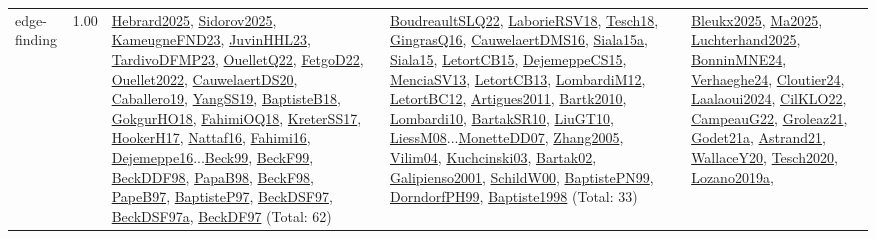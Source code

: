 {\begin{longtable}{p{3cm}r>{\raggedright\arraybackslash}p{6cm}>{\raggedright\arraybackslash}p{6cm}>{\raggedright\arraybackslash}p{8cm}}
\index{edge-finding}\index{Algorithms!edge-finding}edge-finding &  1.00 & \hyperref[detail:Hebrard2025]{Hebrard2025}, \hyperref[detail:Sidorov2025]{Sidorov2025}, \hyperref[detail:KameugneFND23]{KameugneFND23}, \hyperref[detail:JuvinHHL23]{JuvinHHL23}, \hyperref[detail:TardivoDFMP23]{TardivoDFMP23}, \hyperref[detail:OuelletQ22]{OuelletQ22}, \hyperref[detail:FetgoD22]{FetgoD22}, \hyperref[detail:Ouellet2022]{Ouellet2022}, \hyperref[detail:CauwelaertDS20]{CauwelaertDS20}, \hyperref[detail:Caballero19]{Caballero19}, \hyperref[detail:YangSS19]{YangSS19}, \hyperref[detail:BaptisteB18]{BaptisteB18}, \hyperref[detail:GokgurHO18]{GokgurHO18}, \hyperref[detail:FahimiOQ18]{FahimiOQ18}, \hyperref[detail:KreterSS17]{KreterSS17}, \hyperref[detail:HookerH17]{HookerH17}, \hyperref[detail:Nattaf16]{Nattaf16}, \hyperref[detail:Fahimi16]{Fahimi16}, \hyperref[detail:Dejemeppe16]{Dejemeppe16}...\hyperref[detail:Beck99]{Beck99}, \hyperref[detail:BeckF99]{BeckF99}, \hyperref[detail:BeckDDF98]{BeckDDF98}, \hyperref[detail:PapaB98]{PapaB98}, \hyperref[detail:BeckF98]{BeckF98}, \hyperref[detail:PapeB97]{PapeB97}, \hyperref[detail:BaptisteP97]{BaptisteP97}, \hyperref[detail:BeckDSF97]{BeckDSF97}, \hyperref[detail:BeckDSF97a]{BeckDSF97a}, \hyperref[detail:BeckDF97]{BeckDF97} (Total: 62) & \hyperref[detail:BoudreaultSLQ22]{BoudreaultSLQ22}, \hyperref[detail:LaborieRSV18]{LaborieRSV18}, \hyperref[detail:Tesch18]{Tesch18}, \hyperref[detail:GingrasQ16]{GingrasQ16}, \hyperref[detail:CauwelaertDMS16]{CauwelaertDMS16}, \hyperref[detail:Siala15a]{Siala15a}, \hyperref[detail:Siala15]{Siala15}, \hyperref[detail:LetortCB15]{LetortCB15}, \hyperref[detail:DejemeppeCS15]{DejemeppeCS15}, \hyperref[detail:MenciaSV13]{MenciaSV13}, \hyperref[detail:LetortCB13]{LetortCB13}, \hyperref[detail:LombardiM12]{LombardiM12}, \hyperref[detail:LetortBC12]{LetortBC12}, \hyperref[detail:Artigues2011]{Artigues2011}, \hyperref[detail:Bartk2010]{Bartk2010}, \hyperref[detail:Lombardi10]{Lombardi10}, \hyperref[detail:BartakSR10]{BartakSR10}, \hyperref[detail:LiuGT10]{LiuGT10}, \hyperref[detail:LiessM08]{LiessM08}...\hyperref[detail:MonetteDD07]{MonetteDD07}, \hyperref[detail:Zhang2005]{Zhang2005}, \hyperref[detail:Vilim04]{Vilim04}, \hyperref[detail:Kuchcinski03]{Kuchcinski03}, \hyperref[detail:Bartak02]{Bartak02}, \hyperref[detail:Galipienso2001]{Galipienso2001}, \hyperref[detail:SchildW00]{SchildW00}, \hyperref[detail:BaptistePN99]{BaptistePN99}, \hyperref[detail:DorndorfPH99]{DorndorfPH99}, \hyperref[detail:Baptiste1998]{Baptiste1998} (Total: 33) & \hyperref[detail:Bleukx2025]{Bleukx2025}, \hyperref[detail:Ma2025]{Ma2025}, \hyperref[detail:Luchterhand2025]{Luchterhand2025}, \hyperref[detail:BonninMNE24]{BonninMNE24}, \hyperref[detail:Verhaeghe24]{Verhaeghe24}, \hyperref[detail:Cloutier24]{Cloutier24}, \hyperref[detail:Laalaoui2024]{Laalaoui2024}, \hyperref[detail:CilKLO22]{CilKLO22}, \hyperref[detail:CampeauG22]{CampeauG22}, \hyperref[detail:Groleaz21]{Groleaz21}, \hyperref[detail:Godet21a]{Godet21a}, \hyperref[detail:Astrand21]{Astrand21}, \hyperref[detail:WallaceY20]{WallaceY20}, \hyperref[detail:Tesch2020]{Tesch2020}, \hyperref[detail:Lozano2019a]{Lozano2019a}, 
\end{longtable}}
